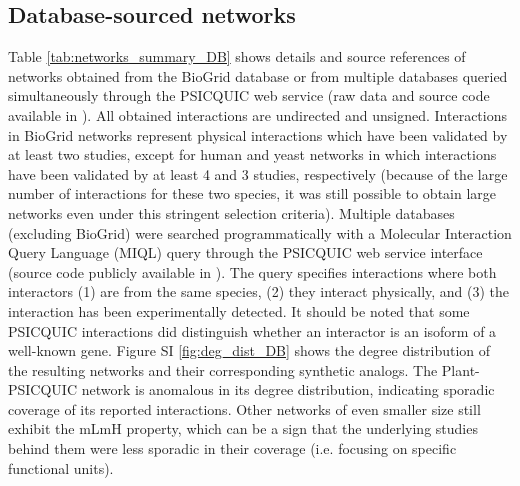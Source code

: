 \documentclass[12pt]{article}	%
\begin{document}
\subsection{Database-sourced networks}\label{sup_realnets_DB}
Table \ref{tab:networks_summary_DB} shows details and source references of networks obtained from the  BioGrid database or from multiple databases queried simultaneously through the PSICQUIC web service (raw data and source code available in  \cite{atiia_case-study_2017}).
All obtained interactions are undirected and unsigned. Interactions in BioGrid networks represent physical interactions which have been validated by at least two studies, except for human and yeast networks in which interactions have been validated by at least 4 and 3 studies, respectively (because of the large number of interactions for these two species, it was still possible to obtain large networks even under this stringent selection criteria). Multiple databases  (excluding BioGrid) were searched programmatically with a Molecular Interaction Query Language (MIQL) query through the  PSICQUIC web service interface (source code publicly available in  \cite{atiia_case-study_2017}).
The query specifies interactions where both interactors (1) are from the same species,  (2) they interact physically, and (3) the interaction has been experimentally detected.
It should be noted that some PSICQUIC interactions did distinguish whether an interactor is an isoform of a well-known gene. Figure SI \ref{fig:deg_dist_DB} shows the degree distribution of the resulting networks and their corresponding synthetic analogs. The Plant-PSICQUIC network is anomalous in its degree distribution, indicating sporadic coverage of its reported interactions. Other networks of even smaller size still exhibit the mLmH property, which can be a sign that the underlying studies behind them were less sporadic in their coverage (i.e. focusing on specific functional units).


\newpage
\end{document}
